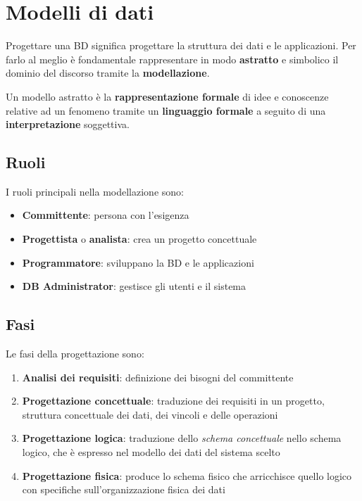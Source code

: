 \newpage
\section{Modelli di dati}
Progettare una BD significa progettare la struttura dei dati e le applicazioni. Per farlo al meglio è fondamentale rappresentare in modo \textbf{astratto} e simbolico il dominio del discorso tramite la \textbf{modellazione}.
\begin{definition}
	Un modello astratto è la \textbf{rappresentazione formale} di idee e conoscenze relative ad un fenomeno tramite un \textbf{linguaggio formale} a seguito di una \textbf{interpretazione} soggettiva.
\end{definition}

\subsection{Ruoli}
I ruoli principali nella modellazione sono:
\begin{itemize}
	\item \textbf{Committente}: persona con l'esigenza
	\item \textbf{Progettista} o \textbf{analista}: crea un progetto concettuale
	\item \textbf{Programmatore}: sviluppano la BD e le applicazioni
	\item \textbf{DB Administrator}: gestisce gli utenti e il sistema
\end{itemize}

\subsection{Fasi}
Le fasi della progettazione sono:
\begin{enumerate}
	\item \textbf{Analisi dei requisiti}: definizione dei bisogni del committente
	\item \textbf{Progettazione concettuale}: traduzione dei requisiti in un progetto, struttura concettuale dei dati, dei vincoli e delle operazioni
	\item \textbf{Progettazione logica}: traduzione dello \textit{schema concettuale} nello schema logico, che è espresso nel modello dei dati del sistema scelto
	\item \textbf{Progettazione fisica}: produce lo schema fisico che arricchisce quello logico con specifiche sull'organizzazione fisica dei dati
\end{enumerate}

